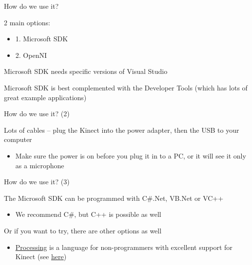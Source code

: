 \documentclass[compress]{beamer}
\providecommand{\tightlist}{%
  \setlength{\itemsep}{0pt}\setlength{\parskip}{0pt}}
\begin{document}
\begin{frame}{How do we use it?}

2 main options:

\begin{itemize}
\tightlist
\item
  1. Microsoft SDK
\item
  2. OpenNI
\end{itemize}

Microsoft SDK needs specific versions of Visual Studio

Microsoft SDK is best complemented with the Developer Tools (which has
lots of great example applications)

\end{frame}

\begin{frame}{How do we use it? (2)}

Lots of cables -- plug the Kinect into the power adapter, then the USB
to your computer

\begin{itemize}
\tightlist
\item
  Make sure the power is on before you plug it in to a PC, or it will
  see it only as a microphone
\end{itemize}

\end{frame}

\begin{frame}{How do we use it? (3)}

The Microsoft SDK can be programmed with C\#.Net, VB.Net or VC++

\begin{itemize}
\tightlist
\item
  We recommend C\#, but C++ is possible as well
\end{itemize}

Or if you want to try, there are other options as well

\begin{itemize}
\tightlist
\item
  \href{https://processing.org/}{Processing} is a language for
  non-programmers with excellent support for Kinect (see
  \href{http://shiffman.net/p5/kinect/}{here})
\end{itemize}

\end{frame}
\end{document}
